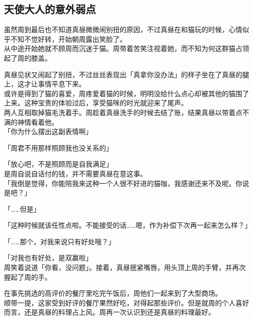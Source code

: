 \subsection{天使大人的意外弱点}

虽然周到最后也不知道真昼微微闹别扭的原因，不过真昼在和猫玩的时候，心情似乎不知不觉好转，开始朝周露出笑脸了。\\

从中途开始她就不顾周而沉迷于猫。周带着苦笑注视着她，而不知为何这群猫占领起了周的膝盖。

真昼见状又闹起了别扭，不过丝丝表现出「真拿你没办法」的样子坐在了真昼的腿上，这才让事情平息下来。\\

或许是得到了猫的喜爱，周疼爱着猫的时候，明明没给什么点心却被其他的猫围了上来。这种宝贵的体验过后，享受猫咪的时光就迎来了尾声。\\

两人互相取掉猫毛洗着手。周趁着真昼洗手的时候去结了账，结果真昼以带着点不满的神情看着他。\\

「你为什么摆出这副表情啊」

「周君不用那样照顾我也没关系的」

「放心吧，不是照顾而是自我满足」\\

是周自说自话付的钱，并不需要真昼在意这事。\\

「我倒是觉得，你能陪我来这种一个人很不好进的猫咖，我感谢还来不及呢。你说是吧？」

「……但是」

「这种时候就该任性点啦。不能接受的话……嗯，作为补偿下次再一起来怎么样？」

「……那个，对我来说只有好处哦？」

「对我也有好处，是双赢啦」\\

周笑着说道「你看，没问题」。接着，真昼抿紧嘴唇，用头顶上周的手臂，并再次握起了周的手。\\

\vspace{2\baselineskip}

在事先挑选的高评价的餐厅里吃完午饭后，周他们一起来到了大型商场。\\

顺带一提，这家受到好评的餐厅果然好吃，对得起那些评价。但是就周的个人喜好而言，还是真昼的料理占上风。周再一次认识到还是真昼的料理最好。\\

